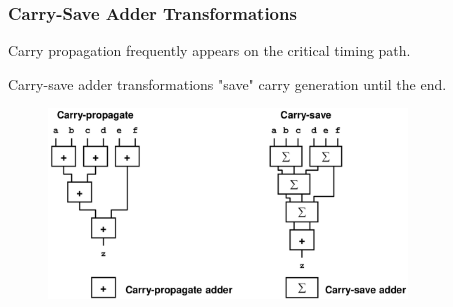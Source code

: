\documentclass[t, notes, xcolor=table]{beamer}
\begin{document}
\begin{frame}
\frametitle{Carry-Save Adder Transformations}
Carry propagation frequently appears on the critical timing path.
\newline

Carry-save adder transformations "save" carry generation until the end.
\begin{figure}
    \includegraphics[width=0.85\textwidth]{img/17_carry_save.png}
\end{figure}
\end{frame}
\end{document}

